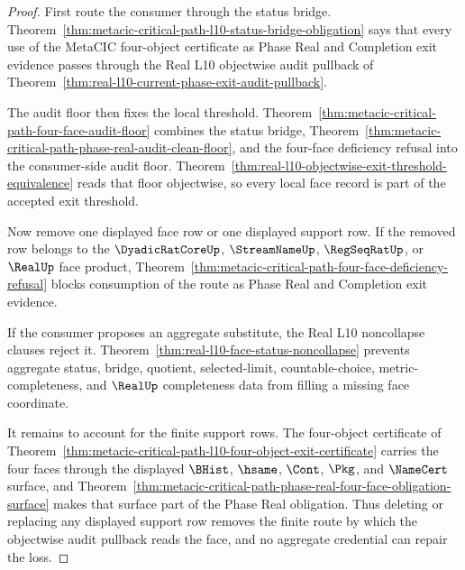 \begin{proof}
First route the consumer through the status bridge. Theorem~\ref{thm:metacic-critical-path-l10-status-bridge-obligation} says that every use of the MetaCIC four-object certificate as Phase Real and Completion exit evidence passes through the Real L10 objectwise audit pullback of Theorem~\ref{thm:real-l10-current-phase-exit-audit-pullback}.

The audit floor then fixes the local threshold. Theorem~\ref{thm:metacic-critical-path-four-face-audit-floor} combines the status bridge, Theorem~\ref{thm:metacic-critical-path-phase-real-audit-clean-floor}, and the four-face deficiency refusal into the consumer-side audit floor. Theorem~\ref{thm:real-l10-objectwise-exit-threshold-equivalence} reads that floor objectwise, so every local face record is part of the accepted exit threshold.

Now remove one displayed face row or one displayed support row. If the removed row belongs to the $\DyadicRatCoreUp$, $\StreamNameUp$, $\RegSeqRatUp$, or $\RealUp$ face product, Theorem~\ref{thm:metacic-critical-path-four-face-deficiency-refusal} blocks consumption of the route as Phase Real and Completion exit evidence.

If the consumer proposes an aggregate substitute, the Real L10 noncollapse clauses reject it. Theorem~\ref{thm:real-l10-face-status-noncollapse} prevents aggregate status, bridge, quotient, selected-limit, countable-choice, metric-completeness, and $\RealUp$ completeness data from filling a missing face coordinate.

It remains to account for the finite support rows. The four-object certificate of Theorem~\ref{thm:metacic-critical-path-l10-four-object-exit-certificate} carries the four faces through the displayed $\BHist$, $\hsame$, $\Cont$, $\Pkg$, and $\NameCert$ surface, and Theorem~\ref{thm:metacic-critical-path-phase-real-four-face-obligation-surface} makes that surface part of the Phase Real obligation. Thus deleting or replacing any displayed support row removes the finite route by which the objectwise audit pullback reads the face, and no aggregate credential can repair the loss.
\end{proof}

